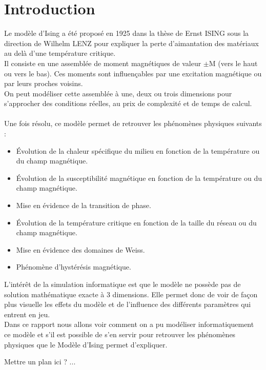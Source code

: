 \section*{Introduction}

Le modèle d'Ising a été proposé en 1925 dans la thèse de Ernst ISING sous la direction de Wilhelm LENZ pour expliquer la perte d'aimantation des matériaux au delà d'une température critique.\\
Il consiste en une assemblée de moment magnétiques de valeur $\pm$M (vers le haut ou vers le bas). Ces moments sont influençables par une excitation magnétique ou par leurs proches voisins.\\
On peut modéliser cette assemblée à une, deux ou trois dimensions pour s'approcher des conditions réelles, au prix de complexité et de temps de calcul.\\
\\
Une fois résolu, ce modèle permet de retrouver les phénomènes physiques suivants :\\
\begin{itemize}
\item Évolution de la chaleur spécifique du milieu en fonction de la température ou du champ magnétique.
\item Évolution de la susceptibilité magnétique en fonction de la température ou du champ magnétique.
\item Mise en évidence de la transition de phase.
\item Évolution de la température critique en fonction de la taille du réseau ou du champ magnétique.
\item Mise en évidence des domaines de Weiss.
\item Phénomène d'hystérésis magnétique.
\end{itemize}
\vspace{\parskip} %

L'intérêt de la simulation informatique est que le modèle ne possède pas de solution mathématique exacte à 3 dimensions. Elle permet donc de voir de façon plus visuelle les effets du modèle et de l'influence des différents paramètres qui entrent en jeu.\\
Dans ce rapport nous allons voir comment on a pu modéliser informatiquement ce modèle et s'il est possible de s'en servir pour retrouver les phénomènes physiques que le Modèle d'Ising permet d'expliquer.\vspace{\parskip}

Mettre un plan ici ? ...